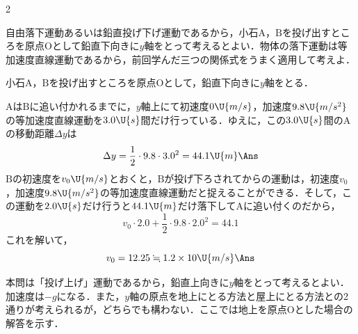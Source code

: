 \begin{multicols}{2}
\par\nopagebreak
\begin{sisin}
自由落下運動あるいは鉛直投げ下げ運動であるから，小石$\mathrm{A}$，$\mathrm{B}$を投げ出すところを原点$\mathrm{O}$として鉛直下向きに$y$軸をとって考えるとよい．物体の落下運動は等加速度直線運動であるから，前回学んだ三つの関係式をうまく適用して考えよ．
\end{sisin}
\par\nopagebreak
\hspace{1zw}小石$\mathrm{A}$，$\mathrm{B}$を投げ出すところを原点$\mathrm{O}$として，鉛直下向きに$y$軸をとる．
\begin{komon}
 $\mathrm{A}$は$\mathrm{B}$に追い付かれるまでに，$y$軸上にて初速度$0\U{m/s}$，加速度$9.8\U{m/s^2}$の等加速度直線運動を$3.0\U{s}$間だけ行っている．ゆえに，この$3.0\U{s}$間の$\mathrm{A}$の移動距離$\Delta y$は
       \[\Delta y=\frac{1}{2}\cdot 9.8\cdot 3.0^2=44.1\U{m}\Ans\]
 $\mathrm{B}$の初速度を$v_0\U{m/s}$とおくと，$\mathrm{B}$が投げ下ろされてからの運動は，初速度$v_0$，加速度$9.8\U{m/s^2}$の等加速度直線運動だと捉えることができる．そして，この運動を$2.0\U{s}$だけ行うと$44.1\U{m}$だけ落下して$\mathrm{A}$に追い付くのだから，
       \[v_0\cdot 2.0+\frac{1}{2}\cdot 9.8\cdot 2.0^2=44.1\]
       これを解いて，
       \[v_0=12.25\fallingdotseq 1.2\times 10\U{m/s}\Ans\]
\end{komon}

\par\nopagebreak
\begin{sisin}
本問は「投げ上げ」運動であるから，鉛直上向きに$y$軸をとって考えるとよい．加速度は$-g$になる．また，$y$軸の原点を地上にとる方法と屋上にとる方法との2通りが考えられるが，どちらでも構わない．ここでは地上を原点$\mathrm{O}$とした場合の解答を示す．


\end{sisin}
\end{multicols}
